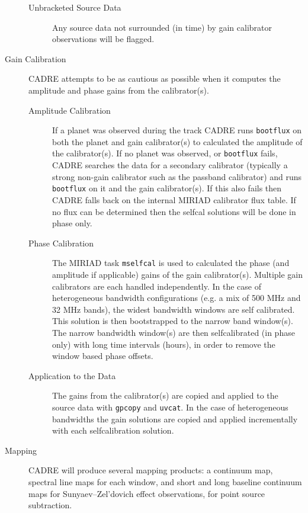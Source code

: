 \begin{description}
\begin{description}
\item[Unbracketed Source Data] Any source data not surrounded (in time) by gain calibrator observations will be flagged.
\end{description}
\item[Gain Calibration] CADRE attempts to be as cautious as possible when it computes the amplitude and phase gains from the calibrator(s).
\begin{description}
\item[Amplitude Calibration] If a planet was observed during the track CADRE runs \verb#bootflux# on both the planet and gain calibrator(s) to calculated the amplitude of the calibrator(s). If no planet was observed, or \verb#bootflux# fails, CADRE searches the data for a secondary calibrator (typically a strong non-gain calibrator such as the passband calibrator) and runs \verb#bootflux# on it and the gain calibrator(s). If this also fails then CADRE falls back on the internal MIRIAD calibrator flux table. If no flux can be determined then the selfcal solutions will be done in phase only.
\item[Phase Calibration] The MIRIAD task \verb#mselfcal# is used to calculated the phase (and amplitude if applicable) gains of the gain calibrator(s). Multiple gain calibrators are each handled independently. In the case of heterogeneous bandwidth configurations (e.g. a mix of 500 MHz and 32 MHz bands), the widest bandwidth windows are self calibrated. This solution is then bootstrapped to the narrow band window(s). The narrow bandwidth window(s) are then selfcalibrated (in phase only) with long time intervals (hours), in order to remove the window based phase offsets.
\item[Application to the Data] The gains from the calibrator(s) are copied and applied to the source data with \verb#gpcopy# and \verb#uvcat#. In the case of heterogeneous bandwidths the gain solutions are copied and applied incrementally with each selfcalibration solution. 
\end{description}
\item[Mapping] CADRE will produce several mapping products: a continuum map, spectral line maps for each window, and short and long baseline continuum maps for Sunyaev–Zel'dovich effect observations, for point source subtraction.

\end{description}
